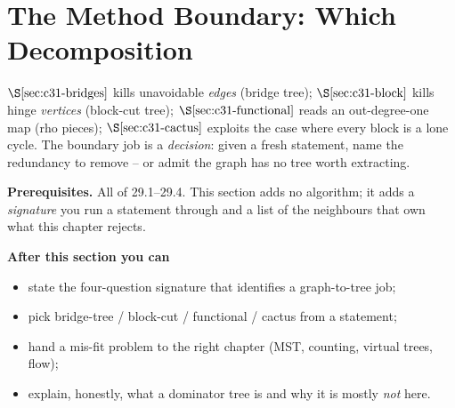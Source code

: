 \section{The Method Boundary: Which Decomposition}\label{sec:c31-boundary}

\begin{previouslybox}
\(\secref{c31-bridges}\) kills unavoidable \emph{edges} (bridge tree);
\(\secref{c31-block}\) kills hinge \emph{vertices} (block-cut tree);
\(\secref{c31-functional}\) reads an out-degree-one map (rho pieces);
\(\secref{c31-cactus}\) exploits the case where every block is a lone cycle.  The
boundary job is a \emph{decision}: given a fresh statement, name the redundancy to
remove -- or admit the graph has no tree worth extracting.
\end{previouslybox}

\begin{topicintro}
\textbf{Prerequisites.} All of 29.1--29.4.  This section adds no algorithm; it adds a
\emph{signature} you run a statement through and a list of the neighbours that own
what this chapter rejects.

\textbf{After this section you can}
\begin{itemize}[nosep]
  \item state the four-question signature that identifies a graph-to-tree job; \hfill{}
  \item pick bridge-tree / block-cut / functional / cactus from a statement; \hfill{}
  \item hand a mis-fit problem to the right chapter (MST, counting, virtual trees, flow); \hfill{}
  \item explain, honestly, what a dominator tree is and why it is mostly \emph{not} here. \hfill{}
\end{itemize}
\end{topicintro}

